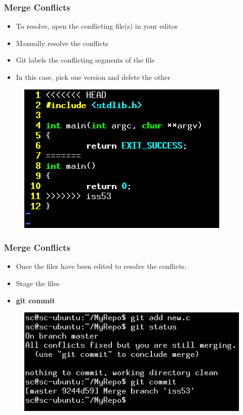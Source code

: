 \documentclass{beamer}
\begin{document}
\begin{frame}
	\frametitle{Merge Conflicts}
	\begin{itemize}
		\item{To resolve, open the conflicting file(s) in your editor}
		\item{Manually resolve the conflicts}
		\item{Git labels the conflicting segments of the file}
		\item{In this case, pick one version and delete the other}
	\end{itemize}
	\begin{figure}
		\includegraphics[scale=0.4]{Merging_Branches-11.png}
	\end{figure}
\end{frame}

\begin{frame}
	\frametitle{Merge Conflicts}
	\begin{itemize}
		\item{Once the files have been edited to resolve the conflicts:}
		\item{Stage the files}
		\item{\textbf{git commit}}
	\end{itemize}
	\begin{figure}
		\includegraphics[scale=0.5]{Merging_Branches-12.png}
	\end{figure}
\end{frame}
\end{document}
